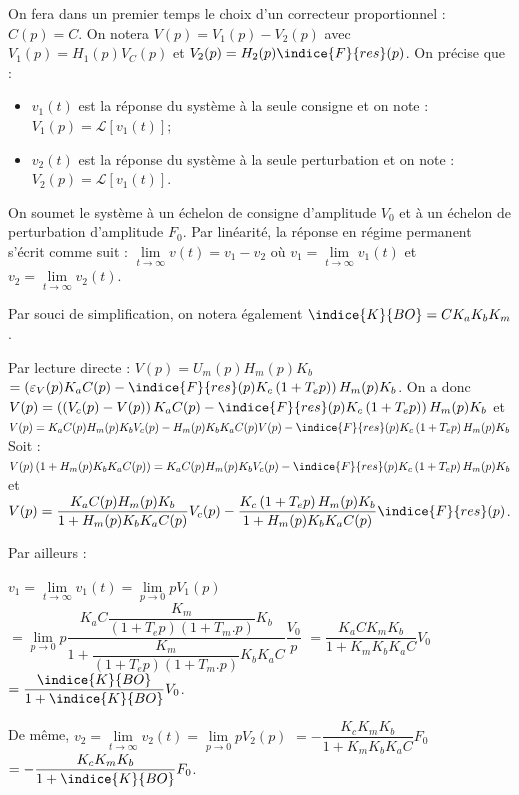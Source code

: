 On fera dans un premier temps le choix d'un correcteur proportionnel : $C(p)=C$.
On notera $V(p)=V_1 (p)-V_2 (p)$ avec $V_1 (p)= H_1 (p) V_C (p)$ et $V_2 (p)=H_2 (p) \indice{F}{res}(p)$. On précise que :
\begin{itemize}
    \item $v_1 (t)$ est la réponse du système à la seule consigne et on note : $V_1 (p)=\mathcal{L}\left[v_1 (t)\right] $;
    \item $v_2 (t)$ est la réponse du système à la seule perturbation et on note : $V_2 (p)=\mathcal{L}\left[v_1 (t)\right]$.
\end{itemize}
On soumet le système à un échelon de consigne d'amplitude $V_0$ et à un échelon de perturbation d'amplitude $F_0$. Par linéarité, la réponse en régime permanent s'écrit comme suit :
$\lim\limits_{t\to \infty} v(t)= v_1 - v_2$ où $v_1=\lim\limits_{t\to \infty}v_1(t)$ et $v_2=\lim\limits_{t\to \infty}v_2(t)$.

Par souci de simplification, on notera également $\indice{K}{BO}=CK_a K_b K_m$.
\fi

\ifprof
\begin{corrige}
Par lecture directe : $V(p)=U_m(p)H_m(p)K_b$ $=\left(\varepsilon_V(p) K_a C(p) - \indice{F}{res}(p)K_c\left(1+T_e p\right)\right) H_m(p)K_b$.
On a donc $V(p)=\left(\left(V_c(p) - V(p) \right) K_a C(p) - \indice{F}{res}(p)K_c\left(1+T_e p\right)\right) H_m(p)K_b$ et $V(p)=K_a C(p)H_m(p)K_bV_c(p) - H_m(p)K_bK_a C(p) V(p)  - \indice{F}{res}(p)K_c\left(1+T_e p\right)H_m(p)K_b$
Soit : 
$V(p)\left(1+ H_m(p)K_bK_a C(p)\right)  =K_a C(p)H_m(p)K_bV_c(p) - \indice{F}{res}(p)K_c\left(1+T_e p\right)H_m(p)K_b$ et 
$V(p) =\dfrac{K_a C(p)H_m(p)K_b}{1+ H_m(p)K_bK_a C(p)}V_c(p) -\dfrac{K_c\left(1+T_e p\right)H_m(p)K_b}{1+ H_m(p)K_bK_a C(p)} \indice{F}{res}(p)$.

Par ailleurs : 

$v_1=\lim\limits_{t\to \infty}v_1(t)=\lim\limits_{p\to0} p V_1(p) $ $=\lim\limits_{p\to0} p   \dfrac{K_a C \dfrac{K_m}{\left(1+T_e p\right) \left(1+T_m.p\right) }K_b}{1+ \dfrac{K_m}{\left(1+T_e p\right) \left(1+T_m.p\right) }K_bK_a C} \dfrac{V_0}{p}$
 $=\dfrac{K_a C K_m K_b}{1+ K_mK_bK_a C} V_0$  $=\dfrac{\indice{K}{BO}}{1+ \indice{K}{BO}} V_0$.
 
De même, $v_2=\lim\limits_{t\to \infty}v_2(t)=\lim\limits_{p\to0} p V_2(p) $
$=-\dfrac{K_c K_mK_b}{1+ K_mK_bK_a C} F_0$ $=-\dfrac{K_c K_mK_b}{1+ \indice{K}{BO}}F_0$.
\end{corrige}
\else
\fi

